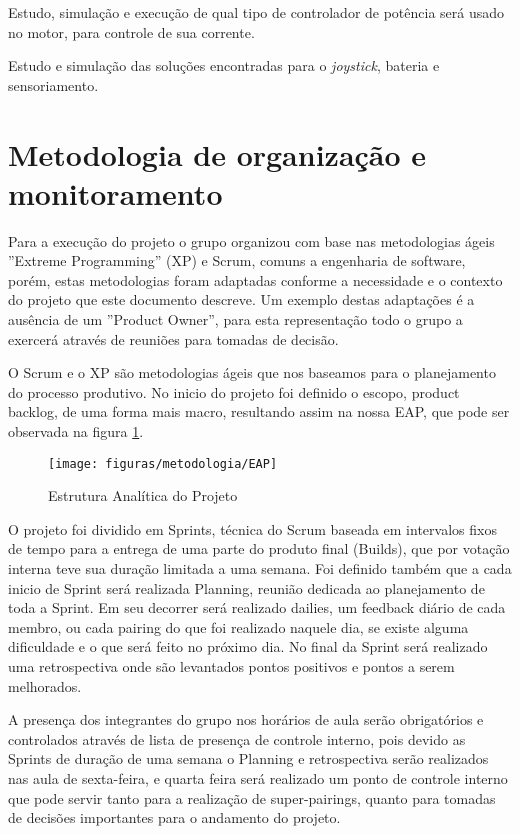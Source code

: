 	Estudo, simulação e execução de qual tipo de controlador de potência será usado no motor, para controle de sua corrente.

	Estudo e simulação das soluções encontradas para o \textit{joystick}, bateria e sensoriamento.

\section{Metodologia de organização e monitoramento}

Para a execução do projeto o grupo organizou com base nas metodologias ágeis ''Extreme Programming'' (XP) e Scrum, comuns a engenharia de software, porém, estas metodologias foram adaptadas conforme a necessidade e o contexto do projeto que este documento descreve. Um exemplo destas adaptações é a ausência de um ''Product Owner'', para esta representação todo o grupo a exercerá através de reuniões para tomadas de decisão.

O Scrum e o XP são metodologias ágeis que nos baseamos para o planejamento do processo produtivo. No inicio do projeto foi definido o escopo, product backlog, de uma forma mais macro, resultando assim na nossa EAP, que pode ser observada na figura \ref{fig:eap}.

\begin{figure}[!htb]
\centering
  \texttt{[image: figuras/metodologia/EAP]}
\caption{Estrutura Analítica do Projeto}
\label{fig:eap}
\end{figure}

O projeto foi dividido em Sprints, técnica do Scrum baseada em intervalos fixos de tempo para a entrega de uma parte do produto final (Builds), que por votação interna teve sua duração limitada a uma semana. Foi definido também que a cada inicio de Sprint será realizada Planning, reunião dedicada ao planejamento de toda a Sprint. Em seu decorrer será realizado dailies, um feedback diário de cada membro, ou cada pairing do que foi realizado naquele dia, se existe alguma dificuldade e o que será feito no próximo dia. No final da Sprint será realizado uma retrospectiva onde são levantados pontos positivos e pontos a serem melhorados.

A presença dos integrantes do grupo nos horários de aula serão obrigatórios e controlados através de lista de presença de controle interno, pois devido as Sprints de duração de uma semana o Planning e retrospectiva serão realizados nas aula de sexta-feira, e quarta feira será realizado um ponto de controle interno que pode servir tanto para a realização de super-pairings, quanto para tomadas de decisões importantes para o andamento do projeto.

